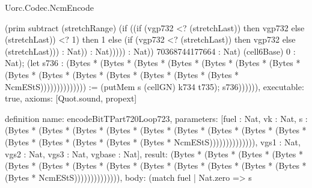 \begin{lexlean}{Uorc.Codec.NcmEncode}
\begin{semanticmodule}
{(prim subtract (stretchRange) (if ((if (vgp732 <? (stretchLast)) then vgp732 else (stretchLast)) <? 1) then 1 else (if (vgp732 <? (stretchLast)) then vgp732 else (stretchLast))) : Nat)) : Nat))))) : Nat)) 70368744177664 : Nat) (cell6Base) 0 : Nat); (let s736 : (Bytes * (Bytes * (Bytes * (Bytes * (Bytes * (Bytes * (Bytes * (Bytes * (Bytes * (Bytes * (Bytes * (Bytes * (Bytes * (Bytes * NcmEStS)))))))))))))) := (putMem s (cellGN) k734 t735); s736)))))),
  executable: true,
  axioms: [Quot.sound, propext]
}

definition{
  name: encodeBitTPart720Loop723,
  parameters: [fuel : Nat, vk : Nat, s : (Bytes * (Bytes * (Bytes * (Bytes * (Bytes * (Bytes * (Bytes * (Bytes * (Bytes * (Bytes * (Bytes * (Bytes * (Bytes * (Bytes * NcmEStS)))))))))))))), vgs1 : Nat, vgs2 : Nat, vgs3 : Nat, vgbase : Nat],
  result: (Bytes * (Bytes * (Bytes * (Bytes * (Bytes * (Bytes * (Bytes * (Bytes * (Bytes * (Bytes * (Bytes * (Bytes * (Bytes * (Bytes * NcmEStS)))))))))))))),
  body: (match fuel
    | Nat.zero => s
}
\end{semanticmodule}
\end{lexlean}
